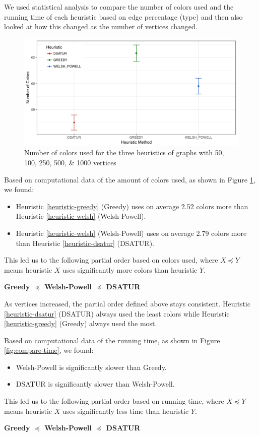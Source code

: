 \documentclass{article}
\newcounter{heuristic} \setcounter{heuristic}{0}
\theoremstyle{definition}
\begin{document}
We used statistical analysis to compare the number of colors used and the running time of each heuristic based on edge percentage (type) and then also looked at how this changed as the number of vertices changed.

\begin{figure}[H]
  \includegraphics[width=\linewidth]{../poster/figures/plot-colors.pdf}
  \caption{Number of colors used for the three heuristics of graphs with 50, 100, 250, 500, \& 1000 vertices}\label{fig:compare-colors}
\end{figure}

Based on computational data of the amount of colors used, as shown in Figure \ref{fig:compare-colors}, we found:
\begin{itemize}
  \item Heuristic \ref{heuristic-greedy} (Greedy) uses on average 2.52 colors more than Heuristic \ref{heuristic-welsh} (Welsh-Powell).
  \item Heuristic \ref{heuristic-welsh} (Welsh-Powell) uses on average 2.79 colors more than Heuristic \ref{heuristic-dsatur} (DSATUR).
\end{itemize}
This led us to the following partial order based on colors used, where $X \preceq Y$ means heuristic $X$ uses significantly more colors than heuristic $Y$.
\begin{center}
  \textbf{Greedy $\preceq$ Welsh-Powell $\preceq$ DSATUR}
\end{center}
As vertices increased, the partial order defined above stays consistent. Heuristic \ref{heuristic-dsatur} (DSATUR) always used the least colors while Heuristic \ref{heuristic-greedy} (Greedy) always used the most.

Based on computational data of the running time, as shown in Figure \ref{fig:compare-time}, we found:
\begin{itemize}
  \item Welsh-Powell is significantly slower than Greedy.
  \item DSATUR is significantly slower than Welsh-Powell.
\end{itemize}
This led us to the following partial order based on running time, where $X \preceq Y$ means heuristic $X$ uses significantly less time than heuristic $Y$.
\begin{center}
  \textbf{Greedy $\preceq$ Welsh-Powell $\preceq$ DSATUR}
\end{center}
\end{document}
